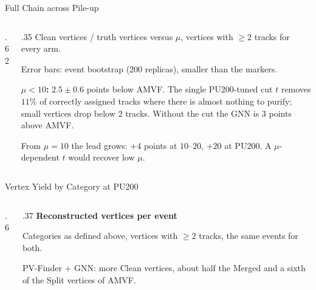 \begin{frame}{Full Chain across Pile-up}
\begin{columns}[c]\begin{column}{.62\linewidth}\centering
{}
\end{column}\begin{column}{.35\linewidth}
\small Clean vertices / truth vertices versus $\mu$, vertices with $\geq2$ tracks for every arm.
\par\vspace{.6em}\footnotesize
Error bars: event bootstrap (200 replicas), smaller than the markers.
\par\vspace{.6em}
\textbf{$\mu<10$:} $2.5\pm0.6$ points below AMVF. The single PU200-tuned cut $t$ removes $11\%$ of correctly assigned tracks where there is almost nothing to purify; small vertices drop below $2$ tracks. Without the cut the GNN is $3$ points above AMVF.
\par\vspace{.5em}
From $\mu=10$ the lead grows: $+4$ points at $10$--$20$, $+20$ at PU200. A $\mu$-dependent $t$ would recover low $\mu$.
\end{column}\end{columns}
\end{frame}

\begin{frame}{Vertex Yield by Category at PU200}
\begin{columns}[c]\begin{column}{.6\linewidth}\centering
{}
\end{column}\begin{column}{.37\linewidth}
\small\textbf{Reconstructed vertices per event}
\par\vspace{.5em}
Categories as defined above, vertices with $\geq2$ tracks, the same events for both.
\par\vspace{.8em}
PV-Finder + GNN: more Clean vertices, about half the Merged and a sixth of the Split vertices of AMVF.
\end{column}\end{columns}
\end{frame}

